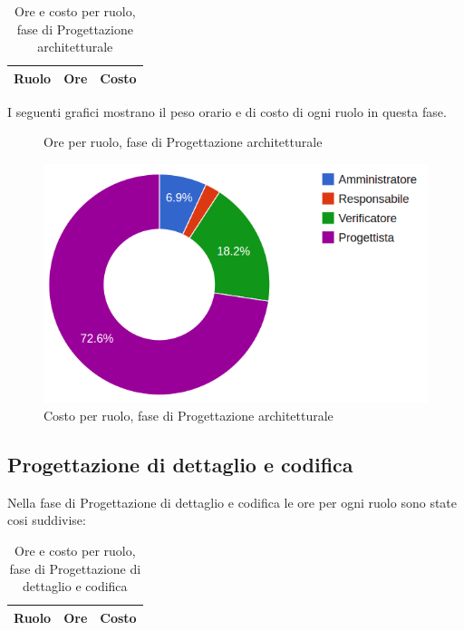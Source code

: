 \begin{table}[H]
	\centering
	\begin{tabular}{ l c c }
	\textbf{Ruolo} & \textbf{Ore} & \textbf{Costo} \\
	\hline
	
		
	
	\end{tabular}
	\caption{Ore e costo per ruolo, fase di Progettazione architetturale}
	\end{table}
	
I seguenti grafici mostrano il peso orario e di costo di ogni ruolo in questa fase.

\begin{figure}[H]
\begin{tikzpicture}

	

\end{tikzpicture}
\caption{Ore per ruolo, fase di Progettazione architetturale}
\end{figure}

\begin{figure}[H]
\centering
\includegraphics[scale=0.4]{5-2-2.png}
\caption{Costo per ruolo, fase di Progettazione architetturale\label{fig:nome}}
\end{figure}

\subsection{Progettazione di dettaglio e codifica}

Nella fase di Progettazione di dettaglio e codifica le ore per ogni ruolo sono state cosi suddivise:

\begin{table}[H]
	\centering
	\begin{tabular}{ l c c }
	\textbf{Ruolo} & \textbf{Ore} & \textbf{Costo} \\
	\hline
	
		
	
	\end{tabular}
	\caption{Ore e costo per ruolo, fase di Progettazione di dettaglio e codifica}
	\end{table}

